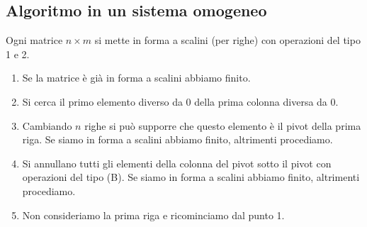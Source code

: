\subsection{Algoritmo in un sistema omogeneo}
\begin{definition}
Ogni matrice $n \times m$ si mette in forma a scalini (per righe) con operazioni del tipo 1 e 2.
\begin{enumerate}[start=0]
    \item Se la matrice è già in forma a scalini abbiamo finito.
    \item Si cerca il primo elemento diverso da $0$ della prima colonna diversa da $0$.
    \item Cambiando $n$ righe si può supporre che questo elemento è il pivot della prima riga. Se siamo in forma a scalini abbiamo finito, altrimenti procediamo.
    \item Si annullano tutti gli elementi della colonna del pivot sotto il pivot  con operazioni del tipo (B). Se siamo in forma a scalini abbiamo finito, altrimenti procediamo.
    \item Non consideriamo la prima riga e ricominciamo dal punto 1.
\end{enumerate}
\end{definition}

